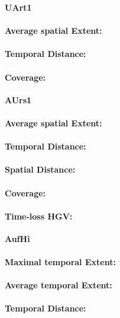 \large
\centerline{\textbf{UArt1}}
\normalsize

\paragraph{Average spatial Extent:}
\paragraph{Temporal Distance:}
\paragraph{Coverage:}

\large
\centerline{\textbf{AUrs1}}
\normalsize

\paragraph{Average spatial Extent:}
\paragraph{Temporal Distance:}
\paragraph{Spatial Distance:}
\paragraph{Coverage:}
\paragraph{Time-loss HGV:}

\large
\centerline{\textbf{AufHi}}
\normalsize

\paragraph{Maximal temporal Extent:}
\paragraph{Average temporal Extent:}
\paragraph{Temporal Distance:}
